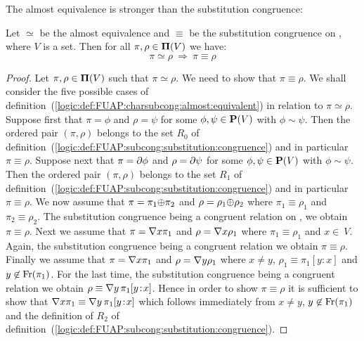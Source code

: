 The almost equivalence is stronger than the substitution congruence:

\begin{prop}\label{logic:prop:FUAP:subcong:almost:implies:sub:congruence}
Let $\simeq$ be the almost equivalence and $\equiv$ be the
substitution congruence on \pvs, where $V$ is a set. Then for all
$\pi,\rho\in\mbox{${\bf\Pi}(V)$}$ we have:
    \[
    \pi\simeq\rho\ \Rightarrow\ \pi\equiv\rho
    \]
\end{prop}
\begin{proof}
Let $\pi,\rho\in\mbox{${\bf\Pi}(V)$}$ such that $\pi\simeq\rho$. We need to show
that $\pi\equiv\rho$. We shall consider the five possible cases of
definition~(\ref{logic:def:FUAP:charsubcong:almost:equivalent}) in
relation to $\pi\simeq\rho$. Suppose first that $\pi=\phi$ and
$\rho=\psi$ for some $\phi,\psi\in\mbox{${\bf P}(V)$}$ with $\phi\sim\psi$. Then the
ordered pair $(\pi,\rho)$ belongs to the set $R_{0}$ of
definition~(\ref{logic:def:FUAP:subcong:substitution:congruence})
and in particular $\pi\equiv\rho$. Suppose next that $\pi=\mbox{$\partial$}\phi$
and $\rho=\mbox{$\partial$}\psi$ for some $\phi,\psi\in\mbox{${\bf P}(V)$}$ with $\phi\sim\psi$.
Then the ordered pair $(\pi,\rho)$ belongs to the set $R_{1}$ of
definition~(\ref{logic:def:FUAP:subcong:substitution:congruence})
and in particular $\pi\equiv\rho$. We now assume that
$\pi=\pi_{1}\mbox{$\oplus$}\pi_{2}$ and $\rho=\rho_{1}\mbox{$\oplus$}\rho_{2}$ where
$\pi_{1}\equiv\rho_{1}$ and $\pi_{2}\equiv\rho_{2}$. The
substitution congruence being a congruent relation on \pvs, we
obtain $\pi\equiv\rho$. Next we assume that $\pi=\mbox{$\nabla$} x\pi_{1}$ and
$\rho=\mbox{$\nabla$} x\rho_{1}$ where $\pi_{1}\equiv\rho_{1}$ and $x\in\ V$.
Again, the substitution congruence being a congruent relation we
obtain $\pi\equiv\rho$. Finally we assume that $\pi=\mbox{$\nabla$} x\pi_{1}$
and $\rho=\mbox{$\nabla$} y\rho_{1}$ where $x\neq y$,
$\rho_{1}\equiv\pi_{1}[y\!:\!x]$ and $y\not\in\mbox{\rm Fr}(\pi_{1})$. For
the last time, the substitution congruence being a congruent
relation we obtain $\rho\equiv\mbox{$\nabla$} y\, \pi_{1}[y\!:\!x]$. Hence in
order to show $\pi\equiv\rho$ it is sufficient to show that $\mbox{$\nabla$}
x\pi_{1}\equiv\mbox{$\nabla$} y\,\pi_{1}[y\!:\!x]$ which follows immediately
from $x\neq y$, $y\not\in\mbox{\rm Fr}(\pi_{1})$ and the definition of
$R_{2}$ of
definition~(\ref{logic:def:FUAP:subcong:substitution:congruence}).
\end{proof}

